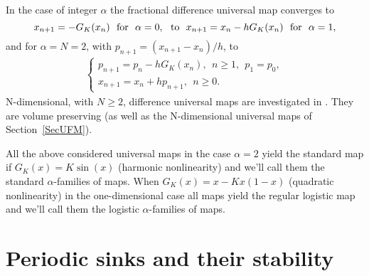\documentclass[graybox]{svmult}
\begin{document}
In the case of integer $\alpha$ the fractional difference universal map converges to 
\begin{equation}
x_{n+1}=-G_K (x_n)  \  \ {\rm for} \  \ \alpha = 0, \  \ {\rm to} \  \ x_{n+1}=x_n-hG_K(x_n)  
\  \ {\rm for} \  \  \alpha = 1, 
\label{IntFrD01} 
\end{equation}
and for $\alpha=N = 2$, with $p_{n+1}=(x_{n+1}-x_n)/h $, to
\begin{equation}
\begin{array}{c}
\left\{
\begin{array}{lll}
p_{n+1}=p_n-h G_K(x_{n}), \ \ n \ge 1, \ \ p_1=p_0,
\\ 
x_{n+1} = x_{n}+h p_{n+1},  \ \ n \ge 0.
\end{array}
\right.
\end{array} 
\label{IntFrD2}
\end{equation} 
N-dimensional, with  $N \ge 2$, difference universal maps are investigated in \cite{ME8}. They are volume preserving (as well as the N-dimensional universal maps of Section~\ref{SecUFM}).
 


 
All the above considered universal maps in the case $\alpha=2$ yield the standard map if $G_K(x)=K\sin(x)$ (harmonic nonlinearity) and we'll call them 
the standard $\alpha$-families of maps.
When $G_K(x)=x-Kx(1-x)$ (quadratic nonlinearity) 
in the one-dimensional case all maps
yield the regular logistic map and we'll call them the logistic 
$\alpha$-families of maps. 





\section{Periodic sinks and their stability}
\label{sec:3}
\end{document}
